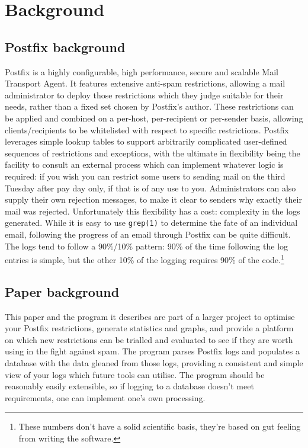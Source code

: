 \documentclass[a4paper,12pt,draft]{article}
\begin{document}
\section{Background}

\subsection{Postfix background}

Postfix is a highly configurable, high performance, secure and scalable
Mail Transport Agent.  It features extensive anti-spam restrictions,
allowing a mail administrator to deploy those restrictions which they judge
suitable for their needs, rather than a fixed set chosen by Postfix's
author.  These restrictions can be applied and combined on a per-host,
per-recipient or per-sender basis, allowing clients/recipients to be
whitelisted with respect to specific restrictions.  Postfix leverages
simple lookup tables to support arbitrarily complicated user-defined
sequences of restrictions and exceptions, with the ultimate in flexibility
being the facility to consult an external process which can implement
whatever logic is required: if you wish you can restrict some users to
sending mail on the third Tuesday after pay day only, if that is of any use
to you.  Administrators can also supply their own rejection messages, to
make it clear to senders why exactly their mail was rejected.
Unfortunately this flexibility has a cost: complexity in the logs
generated.  While it is easy to use \texttt{grep(1)} to determine the fate
of an individual email, following the progress of an email through Postfix
can be quite difficult.  The logs tend to follow a 90\%/10\% pattern: 90\%
of the time following the log entries is simple, but the other 10\% of the
logging requires 90\% of the code.\footnote{These numbers don't have a
solid scientific basis, they're based on gut feeling from writing the
software.}

\subsection{Paper background}

This paper and the program it describes are part of a larger project to
optimise your Postfix restrictions, generate statistics and graphs, and
provide a platform on which new restrictions can be trialled and evaluated
to see if they are worth using in the fight against spam.  The program
parses Postfix logs and populates a database with the data gleaned from
those logs, providing a consistent and simple view of your logs which
future tools can utilise.  The program should be reasonably easily
extensible, so if logging to a database doesn't meet requirements, one can
implement one's own processing.
\end{document}
